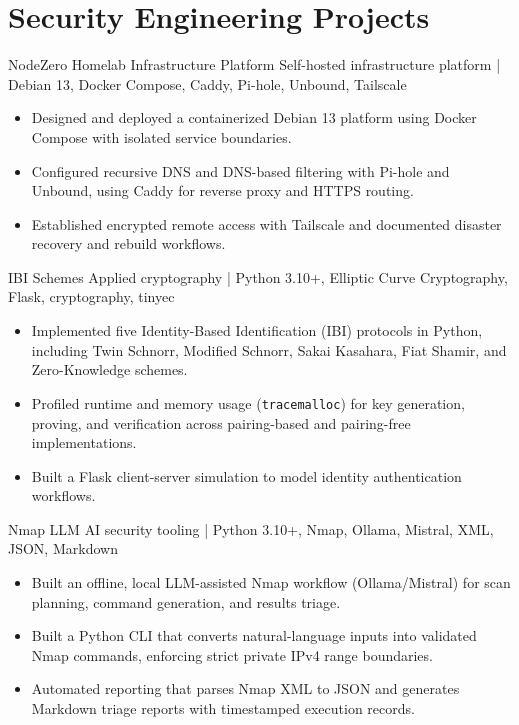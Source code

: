 \section{Security Engineering Projects}

\cvproject
  {NodeZero Homelab Infrastructure Platform}
  {}
  {Self-hosted infrastructure platform | Debian 13, Docker Compose, Caddy, Pi-hole, Unbound, Tailscale}
  {
    \begin{itemize}
      \item Designed and deployed a containerized Debian 13 platform using Docker Compose with isolated service boundaries.
      \item Configured recursive DNS and DNS-based filtering with Pi-hole and Unbound, using Caddy for reverse proxy and HTTPS routing.
      \item Established encrypted remote access with Tailscale and documented disaster recovery and rebuild workflows.
    \end{itemize}
  }

\cvproject
  {IBI Schemes}
  {}
  {Applied cryptography | Python 3.10+, Elliptic Curve Cryptography, Flask, cryptography, tinyec}
  {
    \begin{itemize}
      \item Implemented five Identity-Based Identification (IBI) protocols in Python, including Twin Schnorr, Modified Schnorr, Sakai Kasahara, Fiat Shamir, and Zero-Knowledge schemes.
      \item Profiled runtime and memory usage (\texttt{tracemalloc}) for key generation, proving, and verification across pairing-based and pairing-free implementations.
      \item Built a Flask client-server simulation to model identity authentication workflows.
    \end{itemize}
  }

\cvproject
  {Nmap LLM}
  {}
  {AI security tooling | Python 3.10+, Nmap, Ollama, Mistral, XML, JSON, Markdown}
  {
    \begin{itemize}
      \item Built an offline, local LLM-assisted Nmap workflow (Ollama/Mistral) for scan planning, command generation, and results triage.
      \item Built a Python CLI that converts natural-language inputs into validated Nmap commands, enforcing strict private IPv4 range boundaries.
      \item Automated reporting that parses Nmap XML to JSON and generates Markdown triage reports with timestamped execution records.
    \end{itemize}
  }
